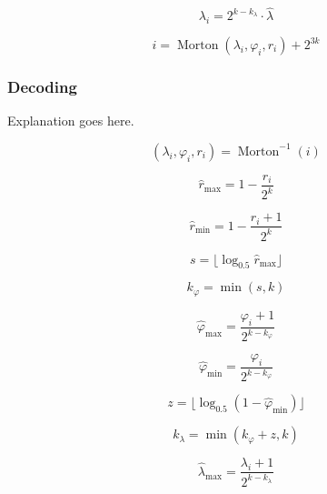 \begin{equation*}
\lambda_i = 2^{k - k_\lambda} \cdot \hat{\lambda}
\end{equation*}

\begin{equation*}
i = \operatorname{Morton}( \lambda_i, \varphi_i, r_i ) + 2^{3k}
\end{equation*}


\subsubsection{Decoding}
Explanation goes here.

\begin{equation*}
( \lambda_i, \varphi_i, r_i ) = \operatorname{Morton}^{-1} (i)%
\end{equation*}

\begin{equation*}
\hat{r}_\mathrm{max} = 1 - \frac{r_i}{2^k}
\end{equation*}

\begin{equation*}
\hat{r}_\mathrm{min} = 1 - \frac{r_i + 1}{2^k}
\end{equation*}

\begin{equation*}
s = \lfloor \log_{0.5} \hat{r}_\mathrm{max} \rfloor
\end{equation*}

\begin{equation*}
k_\varphi = \min ( s, k )
\end{equation*}

\begin{equation*}
\hat{\varphi}_\mathrm{max} = \frac{\varphi_i + 1}{2^{k - k_\varphi}}
\end{equation*}

\begin{equation*}
\hat{\varphi}_\mathrm{min} = \frac{\varphi_i}{2^{k - k_\varphi}}
\end{equation*}

\begin{equation*}
z = \lfloor \log_{0.5} ( 1 - \hat{\varphi}_\mathrm{min} ) \rfloor
\end{equation*}

\begin{equation*}
k_\lambda = \min ( k_\varphi + z, k )
\end{equation*}

\begin{equation*}
\hat{\lambda}_\mathrm{max} = \frac{\lambda_i + 1}{2^{k - k_\lambda}}
\end{equation*}

